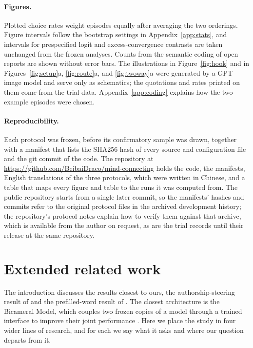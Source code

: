 \paragraph{Figures.}
Plotted choice rates weight episodes equally after averaging the two
orderings. Figure intervals follow the bootstrap settings in
Appendix~\ref{app:stats}, and intervals for prespecified logit and
excess-convergence contrasts are taken unchanged from the frozen
analyses. Counts from the semantic coding of open reports are shown
without error bars. The illustrations in Figure~\ref{fig:hook} and in
Figures~\ref{fig:setup}a, \ref{fig:route}a, and \ref{fig:twoway}a were
generated by a GPT image model and serve only as schematics; the
quotations and rates printed on them come from the trial data.
Appendix~\ref{app:coding} explains how the two example episodes were
chosen.

\paragraph{Reproducibility.}
\label{app:repro}
Each protocol was frozen, before its confirmatory sample was drawn,
together with a manifest that lists the SHA256 hash of every source
and configuration file and the git commit of the code. The repository
at \url{https://github.com/BeibaiDraco/mind-connecting} holds the code, the manifests, English
translations of the three protocols, which were written in Chinese, and
a table that maps every figure and table to the runs it was computed
from. The public repository starts from a single later commit, so the
manifests' hashes and commits refer to the original protocol files in
the archived development history; the repository's protocol notes
explain how to verify them against that archive, which is available
from the author on request, as are the trial records until their
release at the same repository.

\FloatBarrier
\section{Extended related work}
\label{app:related}

The introduction discusses the results closest to ours, the
authorship-steering result of \citet{ackerman2025inspection} and the
prefilled-word result of \citet{lindsey2025introspection}. The closest
architecture is the Bicameral Model, which couples two frozen copies of
a model through a trained interface to improve their joint performance
\citep{flamant2026bicameral}. Here we place the study in four wider
lines of research, and for each we say what it asks and where our
question departs from it.

